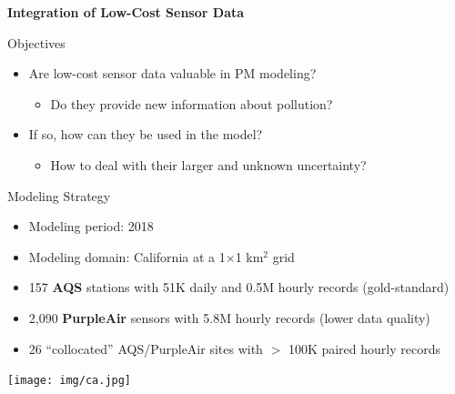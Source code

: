 \begin{frame}{}
\begin{center}
    \Large
    \textbf{Integration of Low-Cost Sensor Data}
\end{center}
\end{frame}

\begin{frame}{Objectives}
    \begin{itemize}
        \item Are low-cost sensor data valuable in PM modeling?
        \begin{itemize}
            \item Do they provide new information about pollution?
        \end{itemize}
        \item If so, how can they be used in the model?
        \begin{itemize}
            \item How to deal with their larger and unknown uncertainty?
        \end{itemize}
    \end{itemize}
\end{frame}

\begin{frame}{Modeling Strategy}
\begin{minipage}{0.5\textwidth}
    \footnotesize
    \begin{itemize}
        \item Modeling period: 2018
        \item Modeling domain: California at a 1$\times$1 km$^2$ grid
        \item 157 \textbf{AQS} stations with 51K daily and 0.5M hourly records (gold-standard)
        \item 2,090 \textbf{PurpleAir} sensors with 5.8M hourly records (lower data quality)
        \item 26 ``collocated'' AQS/PurpleAir sites with $>$ 100K paired hourly records
    \end{itemize}
\end{minipage}
\begin{minipage}{0.48\textwidth}
    \texttt{[image: img/ca.jpg]}
\end{minipage}
\end{frame}

